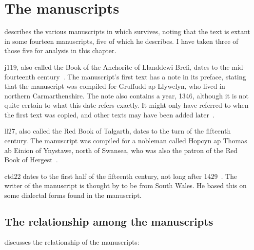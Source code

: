 \section{The manuscripts}
\label{sec:manuscripts-1}

\Textcite[lv--lviii]{Eva_Welsh88} describes the various manuscripts in which  survives, noting that the text is extant in some fourteen manuscripts,  five of which he describes. I have taken three of those five for analysis in this chapter.

\Acrfull{j119}, also called the Book of the Anchorite of Llanddewi Brefi, dates to the mid-fourteenth century~\autocite{Tho_TEI13}. The manuscript's first text has a note in its preface, stating that the manuscript was compiled for Gruffudd ap Llywelyn, who lived in northern Carmarthenshire. The note also contains a year, 1346, although it is not quite certain to what this date refers exactly. It might only have referred to when the first text was copied, and other texts may have been added later~\autocite[lvi--lvii]{Eva_Welsh88}.

\Acrfull{ll27}, also called the Red Book of Talgarth, dates to the turn of the fifteenth century. The manuscript was compiled for a nobleman called Hopcyn ap Thomas ab Einion of Ynystawe, north of Swansea, who was also the patron of the Red Book of Hergest~\autocite[lvii]{Eva_Welsh88}.

\Acrfull{ctd22} dates to the first half of the fifteenth century, not long after 1429~\autocite{Eva_Welsh88}. The writer of the manuscript is thought by \textcite[107]{Pow_description81} to be from South Wales. He based this on some dialectal forms found in the manuscript.

\subsection{The relationship among the manuscripts}
\label{sec:relat-betw-manuscr}
\textcite{Eva_Welsh88} discusses the relationship of the manuscripts:


